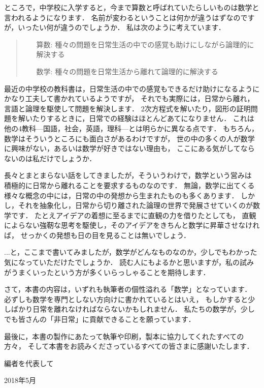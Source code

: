 ところで，中学校に入学すると，今まで算数と呼ばれていたらしいものは数学と言われるようになります．
名前が変わるということは何かが違うはずなのですが，いったい何が違うのでしょうか．
私は次のように考えています．
\begin{quote}
\begin{itemize}
\item[算数:]種々の問題を日常生活の中での感覚も助けにしながら論理的に解決する
\item[数学:]種々の問題を日常生活から離れて論理的に解決する
\end{itemize}
\end{quote}
最近の中学校の教科書は，日常生活の中での感覚もできるだけ助けになるようにかなり工夫して書かれているようですが，
それでも実際には，日常から離れ，言語と論理を駆使して問題を解決します．
2次方程式を解いたり，図形の証明問題を解いたりするときに，日常での経験はほとんどあてになりません．
これは他の4教科---国語，社会，英語，理科---とは明らかに異なる点です．
もちろん，数学はそういうところにも面白さがあるわけですが，
世の中の多くの人が数学に興味がない，あるいは数学が好きではない理由も，
ここにある気がしてならないのは私だけでしょうか．

長々とまとまらない話をしてきましたが，そういうわけで，数学という営みは
積極的に日常から離れることを要求するものなのです．
無論，数学に出てくる様々な概念の中には，日常の中の発想から生まれたものも多くあります．
しかし，それを抽象化し，日常から切り離された論理の世界で発展させていくのが数学です．
たとえアイデアの着想に至るまでに直観の力を借りたとしても，
直観によらない強靭な思考を駆使し，そのアイデアをきちんと数学に昇華させなければ，
せっかくの発想も日の目を見ることは無いでしょう．

...と，ここまで書いてみましたが，数学がどんなものなのか，少しでもわかった気になっていただけたでしょうか．
読む人にもよるかと思いますが，私の試みがうまくいったという方が多くいらっしゃることを期待します．

さて，本書の内容は，いずれも執筆者の個性溢れる「数学」となっています．
必ずしも数学を専門としない方向けに書かれているとはいえ，
もしかすると少しばかり日常を離れなければならないかもしれません．
私たちの数学が，少しでも皆さんの「非日常」に貢献できることを願っています．

最後に，本書の製作にあたって執筆や印刷，製本に協力してくれたすべての方々，
そして本書をお読みくださっているすべての皆さまに感謝いたします．

\begin{flushright}
編者を代表して

2018年5月
\end{flushright}